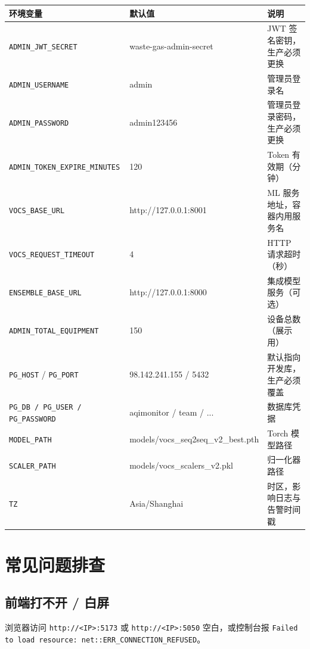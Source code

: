 \documentclass[UTF8,a4paper,11pt]{ctexart}
\begin{document}
\begin{longtable}{L{4.8cm} L{3.5cm} L{5.5cm}}
\toprule
\textbf{环境变量} & \textbf{默认值} & \textbf{说明} \\
\midrule
\endhead
\texttt{ADMIN\_JWT\_SECRET}           & waste-gas-admin-secret     & JWT 签名密钥，生产必须更换 \\
\texttt{ADMIN\_USERNAME}              & admin                      & 管理员登录名 \\
\texttt{ADMIN\_PASSWORD}              & admin123456                & 管理员登录密码，生产必须更换 \\
\texttt{ADMIN\_TOKEN\_EXPIRE\_MINUTES}& 120                        & Token 有效期（分钟） \\
\texttt{VOCS\_BASE\_URL}              & http://127.0.0.1:8001      & ML 服务地址，容器内用服务名 \\
\texttt{VOCS\_REQUEST\_TIMEOUT}       & 4                          & HTTP 请求超时（秒） \\
\texttt{ENSEMBLE\_BASE\_URL}          & http://127.0.0.1:8000      & 集成模型服务（可选） \\
\texttt{ADMIN\_TOTAL\_EQUIPMENT}      & 150                        & 设备总数（展示用） \\
\texttt{PG\_HOST} / \texttt{PG\_PORT} & 98.142.241.155 / 5432      & 默认指向开发库，生产必须覆盖 \\
\texttt{PG\_DB / PG\_USER / PG\_PASSWORD} & aqimonitor / team / ...& 数据库凭据 \\
\texttt{MODEL\_PATH}                  & models/vocs\_seq2seq\_v2\_best.pth & Torch 模型路径 \\
\texttt{SCALER\_PATH}                 & models/vocs\_scalers\_v2.pkl       & 归一化器路径 \\
\texttt{TZ}                           & Asia/Shanghai              & 时区，影响日志与告警时间戳 \\
\bottomrule
\end{longtable}

\section{常见问题排查}

\subsection{前端打不开 / 白屏}

\begin{warnbox}[现象]
浏览器访问 \texttt{http://<IP>:5173} 或 \texttt{http://<IP>:5050} 空白，或控制台报
\texttt{Failed to load resource: net::ERR\_CONNECTION\_REFUSED}。
\end{warnbox}
\end{document}
